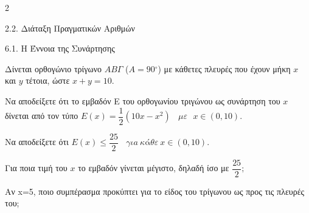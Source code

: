 \begin{ylh}{2}
    \item 2.2. Διάταξη Πραγματικών Αριθμών
    \item 6.1. Η Έννοια της Συνάρτησης
\end{ylh}
Δίνεται ορθογώνιο τρίγωνο $AB\varGamma$ ($A = 90{^\circ}$) με κάθετες πλευρές που έχουν μήκη $x$ και $y$ τέτοια, ώστε $x+y=10$.

\begin{alist}
\item Να αποδείξετε ότι το εμβαδόν Ε του ορθογωνίου τριγώνου ως συνάρτηση του $x$ δίνεται από τον τύπο $E(x) = \dfrac{1}{2}\left( 10x - x^{2} \right)\ \ \ \ \mu\varepsilon\ \ \ x \in (0,10)$.
\begin{rlist}
\item Να αποδείξετε ότι $E(x) \leq \dfrac{25}{2}\ \ \ \ \gamma\iota a\ \kappa ά\theta\varepsilon\ x \in (0,10)$.
\item Για ποια τιμή του $x$ το εμβαδόν γίνεται μέγιστο, δηλαδή ίσο με $\dfrac{25}{2};$
\end{rlist}
\item Αν x=5, ποιο συμπέρασμα προκύπτει για το είδος του τρίγωνου ως προς τις πλευρές του;
\end{alist}

